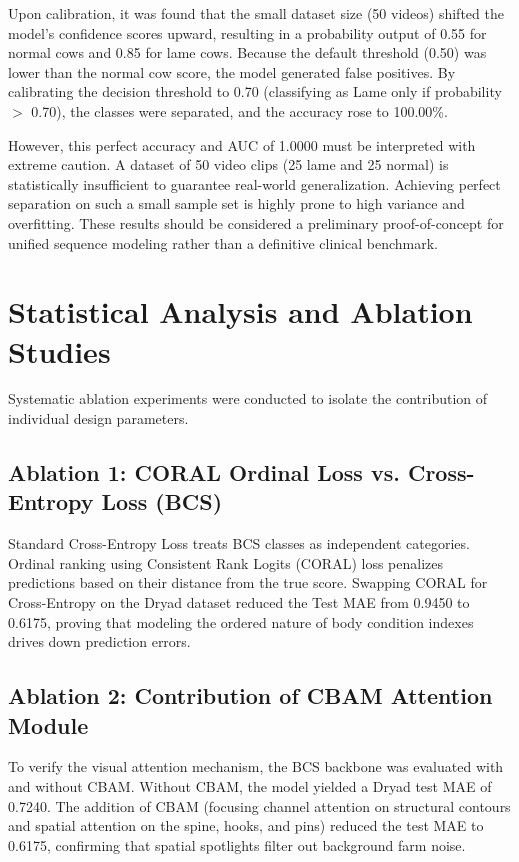 Upon calibration, it was found that the small dataset size (50 videos) shifted the model's confidence scores upward, resulting in a probability output of 0.55 for normal cows and 0.85 for lame cows. Because the default threshold (0.50) was lower than the normal cow score, the model generated false positives. By calibrating the decision threshold to 0.70 (classifying as Lame only if probability $>$ 0.70), the classes were separated, and the accuracy rose to 100.00\%.

However, this perfect accuracy and AUC of 1.0000 must be interpreted with extreme caution. A dataset of 50 video clips (25 lame and 25 normal) is statistically insufficient to guarantee real-world generalization. Achieving perfect separation on such a small sample set is highly prone to high variance and overfitting. These results should be considered a preliminary proof-of-concept for unified sequence modeling rather than a definitive clinical benchmark.

\section{Statistical Analysis and Ablation Studies}
Systematic ablation experiments were conducted to isolate the contribution of individual design parameters.

\subsection{Ablation 1: CORAL Ordinal Loss vs. Cross-Entropy Loss (BCS)}
Standard Cross-Entropy Loss treats BCS classes as independent categories. Ordinal ranking using Consistent Rank Logits (CORAL) loss penalizes predictions based on their distance from the true score. Swapping CORAL for Cross-Entropy on the Dryad dataset reduced the Test MAE from 0.9450 to 0.6175, proving that modeling the ordered nature of body condition indexes drives down prediction errors.

\subsection{Ablation 2: Contribution of CBAM Attention Module}
To verify the visual attention mechanism, the BCS backbone was evaluated with and without CBAM. Without CBAM, the model yielded a Dryad test MAE of 0.7240. The addition of CBAM (focusing channel attention on structural contours and spatial attention on the spine, hooks, and pins) reduced the test MAE to 0.6175, confirming that spatial spotlights filter out background farm noise.

